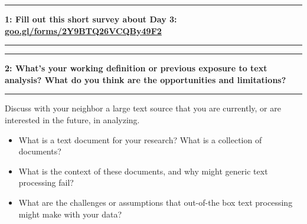 \documentclass[11pt]{article}
\newcommand\question[2]{\vspace{.25in}\hrule\textbf{#1: #2}\vspace{.5em}\hrule\vspace{.10in}}
\begin{document}
\raggedright
\newcommand\NAME{Allie Morgan} 

\vspace{-0.2 in}
\question{1}{Fill out this short survey about Day 3: \href{https://goo.gl/forms/2Y9BTQ26VCQBy49F2}{goo.gl/forms/2Y9BTQ26VCQBy49F2}} 
\vspace{1 in}

\question{2}{What's your working definition or previous exposure to text analysis? What do you think are the opportunities and limitations?}

Discuss with your neighbor a large text source that you are currently, or are interested in the future, in analyzing. 
\begin{itemize}
\item What is a text document for your research? What is a collection of documents? 
\item What is the context of these documents, and why might generic text processing fail? 
\item What are the challenges or assumptions that out-of-the box text processing might make with your data?
\end{itemize}
\end{document}
